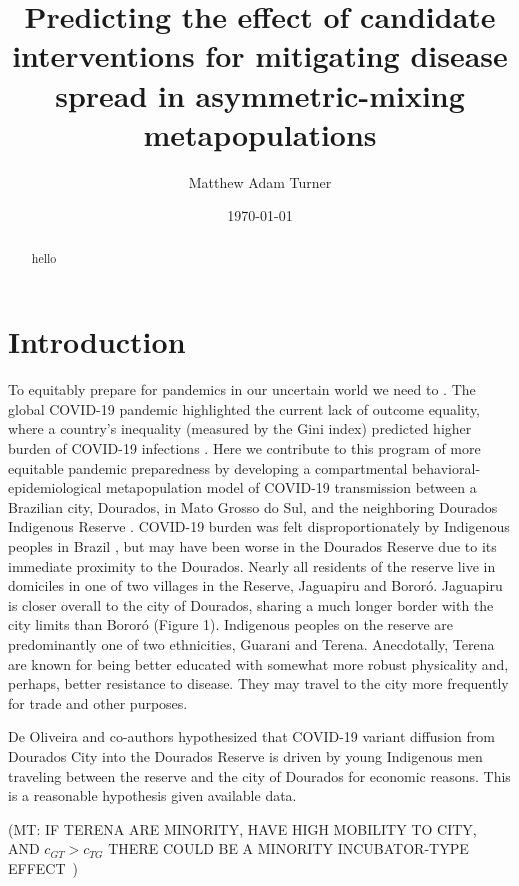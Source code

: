 \documentclass[
  letterpaper,
  abstract]{scrartcl}
\title{Predicting the effect of candidate interventions for mitigating
disease spread in asymmetric-mixing metapopulations}
\author{Matthew Adam Turner}
\date{\today}
\renewcommand*\contentsname{Table of contents}
\newcommand\contentsname{Table of contents}
\newcommand{\mt}[1]{{\textcolor{myorange} {({\tiny MT:} #1)}}}
\begin{document}
\maketitle
\begin{abstract}
\noindent hello
\end{abstract}

\renewcommand*\contentsname{Table of contents}
{
\hypersetup{linkcolor=}
\setcounter{tocdepth}{3}
\tableofcontents
}
\section{Introduction}\label{introduction}

To equitably prepare for pandemics in our uncertain world we need to
\autocite{Rodo2021,Adashi2022}. The global COVID-19 pandemic highlighted
the current lack of outcome equality, where a country's inequality
(measured by the Gini index) predicted higher burden of COVID-19
infections \autocite{Su2022}. Here we contribute to this program of more
equitable pandemic preparedness by developing a compartmental
behavioral-epidemiological metapopulation model of COVID-19 transmission
between a Brazilian city, Dourados, in Mato Grosso do Sul, and the
neighboring Dourados Indigenous Reserve \autocite{DeOliveira2023}.
COVID-19 burden was felt disproportionately by Indigenous peoples in
Brazil \autocite{Simionatto2020}, but may have been worse in the
Dourados Reserve due to its immediate proximity to the Dourados. Nearly
all residents of the reserve live in domiciles in one of two villages in
the Reserve, Jaguapiru and Bororó. Jaguapiru is closer overall to the
city of Dourados, sharing a much longer border with the city limits than
Bororó (Figure 1). Indigenous peoples on the reserve are predominantly
one of two ethnicities, Guarani and Terena. Anecdotally, Terena are
known for being better educated with somewhat more robust physicality
and, perhaps, better resistance to disease. They may travel to the city
more frequently for trade and other purposes.

De Oliveira and co-authors hypothesized that COVID-19 variant diffusion
from Dourados City into the Dourados Reserve is driven by young
Indigenous men traveling between the reserve and the city of Dourados
for economic reasons. This is a reasonable hypothesis given available
data.

\mt{IF TERENA ARE MINORITY, HAVE HIGH MOBILITY TO CITY, AND $c_{GT} > c_{TG}$
THERE COULD BE A MINORITY INCUBATOR-TYPE EFFECT~\autocite{Turner2023}}
\end{document}
